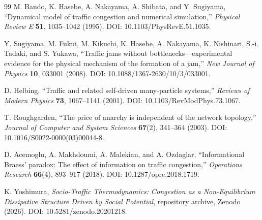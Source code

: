 \documentclass[11pt]{article}
\begin{document}
\begin{thebibliography}{99}
M. Bando, K. Hasebe, A. Nakayama, A. Shibata, and Y. Sugiyama,
``Dynamical model of traffic congestion and numerical simulation,''
\emph{Physical Review E} \textbf{51}, 1035--1042 (1995). DOI: 10.1103/PhysRevE.51.1035.

Y. Sugiyama, M. Fukui, M. Kikuchi, K. Hasebe, A. Nakayama, K. Nishinari, S.-i. Tadaki, and S. Yukawa,
``Traffic jams without bottlenecks---experimental evidence for the physical mechanism of the formation of a jam,''
\emph{New Journal of Physics} \textbf{10}, 033001 (2008). DOI: 10.1088/1367-2630/10/3/033001.

D. Helbing,
``Traffic and related self-driven many-particle systems,''
\emph{Reviews of Modern Physics} \textbf{73}, 1067--1141 (2001). DOI: 10.1103/RevModPhys.73.1067.

T. Roughgarden,
``The price of anarchy is independent of the network topology,''
\emph{Journal of Computer and System Sciences} \textbf{67}(2), 341--364 (2003). DOI: 10.1016/S0022-0000(03)00044-8.

D. Acemoglu, A. Makhdoumi, A. Malekian, and A. Ozdaglar,
``Informational Braess' paradox: The effect of information on traffic congestion,''
\emph{Operations Research} \textbf{66}(4), 893--917 (2018). DOI: 10.1287/opre.2018.1719.

K. Yoshimura,
\emph{Socio-Traffic Thermodynamics: Congestion as a Non-Equilibrium Dissipative Structure Driven by Social Potential},
repository archive, Zenodo (2026). DOI: 10.5281/zenodo.20201218.
\end{thebibliography}
\end{document}
